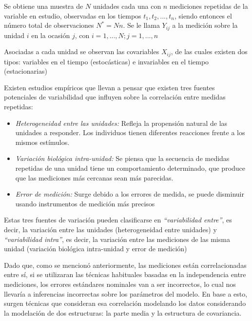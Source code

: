\documentclass[spanish]{article}
\numberwithin{figure}{subsection}
\numberwithin{equation}{subsection}
\numberwithin{table}{subsection}
\begin{document}
Se obtiene una muestra de $N$ unidades cada una con $n$ mediciones repetidas de
la variable en estudio, observadas en los tiempos $t_1, t_2, ..., t_n$, siendo
entonces el número total de observaciones $N^*=Nn$. Se le llama $Y_{ij}$ a la
medición sobre la unidad $i$ en la ocasión $j$, con $i=1, ..., N; j=1, ..., n$

Asociadas a cada unidad se observan las covariables $X_{ij}$, de las cuales
existen dos tipos: variables en el tiempo (estocásticas) e invariables en el
tiempo (estacionarias)

Existen estudios empíricos que llevan a pensar que existen tres fuentes
potenciales de variabilidad que influyen sobre la correlación entre medidas
repetidas:

\begin{itemize}
	\item \textit{Heterogeneidad entre las unidades:} Refleja la propensión
	natural de las unidades a responder. Los individuos tienen diferentes
	reacciones frente a los mismos estímulos.
	\item \textit{Variación biológica intra-unidad:} Se piensa que la secuencia
	de medidas repetidas de una unidad tiene un comportamiento determinado, que
	produce que las mediciones más cercanas sean más parecidas.
	\item \textit{Error de medición:} Surge debido a los errores de medida, se
	puede disminuir usando instrumentos de medición más precisos
\end{itemize}

Estas tres fuentes de variación pueden clasificarse en \textit{``variabilidad
entre''}, es decir, la variación entre las unidades (heterogeneidad entre
unidades) y \textit{``variabilidad intra''}, es decir, la variación entre las
mediciones de las misma unidad (variación biológica intra-unidad y error de
medición)

Dado que, como se mencionó anteriormente, las mediciones están correlacionadas
entre sí, si se utilizaran las técnicas habituales basadas en la independencia
entre mediciones, los errores estándares nominales van a ser incorrectos, lo
cual nos llevaría a inferencias incorrectas sobre los parámetros del modelo. En
base a esto, surgen técnicas que consideran esa correlación modelando los datos
considerando la modelación de dos estructuras: la parte media y la estructura
de covariancia.

\end{document}

